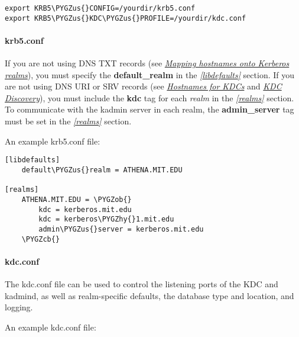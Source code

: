 \documentclass[letterpaper,10pt,english]{sphinxmanual}
\def\PYGZus{\char`\_}
\def\PYGZob{\char`\{}
\def\PYGZcb{\char`\}}
\def\PYGZhy{\char`\-}
\begin{document}
\begin{Verbatim}[commandchars=\\\{\}]
export KRB5\PYGZus{}CONFIG=/yourdir/krb5.conf
export KRB5\PYGZus{}KDC\PYGZus{}PROFILE=/yourdir/kdc.conf
\end{Verbatim}


\paragraph{krb5.conf}
\label{admin/install_kdc:krb5-conf}
If you are not using DNS TXT records (see {\hyperref[admin/realm_config:mapping-hostnames]{\emph{Mapping hostnames onto Kerberos realms}}}),
you must specify the \textbf{default\_realm} in the {\hyperref[admin/conf_files/krb5_conf:libdefaults]{\emph{{[}libdefaults{]}}}}
section.  If you are not using DNS URI or SRV records (see
{\hyperref[admin/realm_config:kdc-hostnames]{\emph{Hostnames for KDCs}}} and {\hyperref[admin/realm_config:kdc-discovery]{\emph{KDC Discovery}}}), you must include the
\textbf{kdc} tag for each \emph{realm} in the {\hyperref[admin/conf_files/krb5_conf:realms]{\emph{{[}realms{]}}}} section.  To
communicate with the kadmin server in each realm, the \textbf{admin\_server}
tag must be set in the
{\hyperref[admin/conf_files/krb5_conf:realms]{\emph{{[}realms{]}}}} section.

An example krb5.conf file:

\begin{Verbatim}[commandchars=\\\{\}]
[libdefaults]
    default\PYGZus{}realm = ATHENA.MIT.EDU

[realms]
    ATHENA.MIT.EDU = \PYGZob{}
        kdc = kerberos.mit.edu
        kdc = kerberos\PYGZhy{}1.mit.edu
        admin\PYGZus{}server = kerberos.mit.edu
    \PYGZcb{}
\end{Verbatim}


\paragraph{kdc.conf}
\label{admin/install_kdc:kdc-conf}
The kdc.conf file can be used to control the listening ports of the
KDC and kadmind, as well as realm-specific defaults, the database type
and location, and logging.

An example kdc.conf file:
\end{document}
